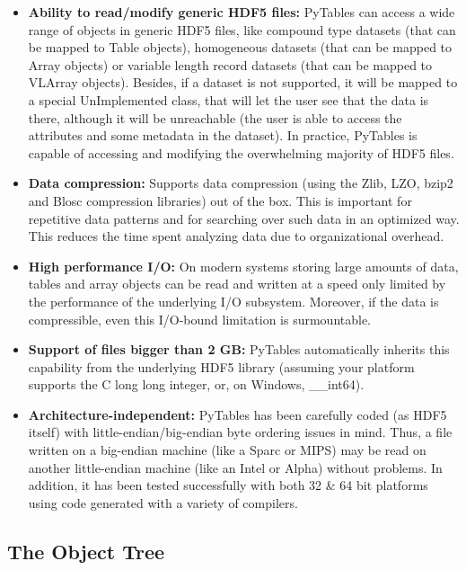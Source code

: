 \begin{itemize}
\item \textbf{Ability to read/modify generic HDF5
  files:} PyTables can access a wide range of objects in
  generic HDF5 files, like compound type datasets (that can be
  mapped to Table objects), homogeneous datasets
  (that can be mapped to Array objects) or
  variable length record datasets (that can be mapped to
  VLArray objects). Besides, if a dataset is not
  supported, it will be mapped to a special
  UnImplemented class,
  that will let the user see that the data is there, although it
  will be unreachable (the user is able to access the
  attributes and some metadata in the dataset). In practice, PyTables
  is capable of accessing and modifying the overwhelming majority of
  HDF5 files.

\item \textbf{Data compression:} Supports data
  compression (using the Zlib, LZO, bzip2
  and Blosc compression libraries) out of the
  box. This is important for repetitive data patterns and
  for searching over such data in an optimized way. This 
  reduces the time spent analyzing data due to organizational 
    overhead.

\item \textbf{High performance I/O:} On modern systems
  storing large amounts of data, tables and array objects can be
  read and written at a speed only limited by the performance of the
  underlying I/O subsystem. Moreover, if the data is compressible,
  even this I/O-bound limitation is surmountable.

\item \textbf{Support of files bigger than 2 GB:}
  PyTables automatically inherits this capability from the
  underlying HDF5 library (assuming your platform supports the C
  long long integer, or, on Windows, \_\_int64).

\item \textbf{Architecture-independent:} PyTables has
  been carefully coded (as HDF5 itself) with
  little-endian/big-endian byte ordering issues in mind. Thus, a
  file written on a big-endian machine (like a Sparc or MIPS) may be
  read on another little-endian machine (like an Intel or Alpha)
  without problems. In addition, it has been tested successfully
  with both 32 \& 64 bit platforms using code generated with a variety 
  of compilers.

\end{itemize}


\subsection{The Object Tree}

